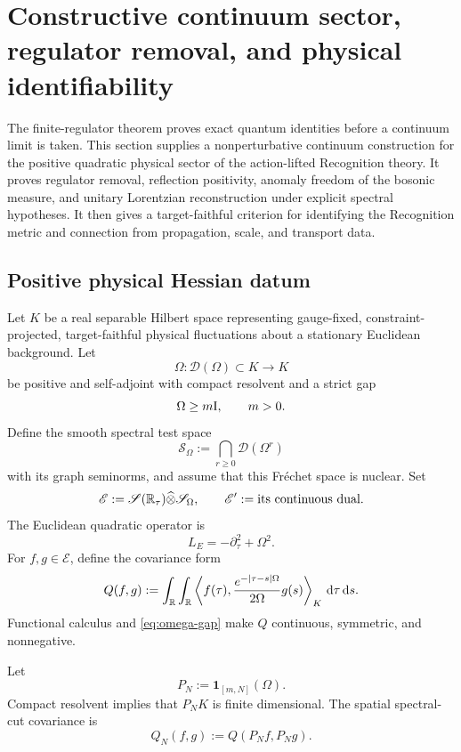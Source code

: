 \section{Constructive continuum sector, regulator removal, and physical identifiability}
\label{sec:constructive-continuum}

The finite-regulator theorem proves exact quantum identities before a continuum limit is taken.  This section supplies a nonperturbative continuum construction for the positive quadratic physical sector of the action-lifted Recognition theory.  It proves regulator removal, reflection positivity, anomaly freedom of the bosonic measure, and unitary Lorentzian reconstruction under explicit spectral hypotheses.  It then gives a target-faithful criterion for identifying the Recognition metric and connection from propagation, scale, and transport data.

\subsection{Positive physical Hessian datum}

Let $K$ be a real separable Hilbert space representing gauge-fixed, constraint-projected, target-faithful physical fluctuations about a stationary Euclidean background.  Let
\[
\Omega:\mathcal D(\Omega)\subset K\longrightarrow K
\]
be positive and self-adjoint with compact resolvent and a strict gap
\begin{equation}
\Omega\ge m\mathrm I,
\qquad m>0.
\label{eq:omega-gap}
\end{equation}
Define the smooth spectral test space
\[
\mathscr S_\Omega:=\bigcap_{r\ge0}\mathcal D(\Omega^r)
\]
with its graph seminorms, and assume that this Fr\'{e}chet space is nuclear.  Set
\[
\mathscr E
:=\mathscr S(\mathbb R_\tau)\widehat\otimes\mathscr S_\Omega,
\qquad
\mathscr E'
:=\text{its continuous dual}.
\]
The Euclidean quadratic operator is
\[
L_E=-\partial_\tau^2+\Omega^2.
\]
For $f,g\in\mathscr E$, define the covariance form
\begin{equation}
Q(f,g)
:=\int_{\mathbb R}\int_{\mathbb R}
\left\langle
f(\tau),
\frac{e^{-\left|\tau-s\right|\Omega}}{2\Omega}
 g(s)
\right\rangle_K
\,\mathrm d\tau\,\mathrm d s.
\label{eq:continuum-covariance}
\end{equation}
Functional calculus and \eqref{eq:omega-gap} make $Q$ continuous, symmetric, and nonnegative.

Let
\[
P_N:=\mathbf 1_{[m,N]}(\Omega).
\]
Compact resolvent implies that $P_NK$ is finite dimensional.  The spatial spectral-cut covariance is
\begin{equation}
Q_N(f,g):=Q(P_Nf,P_Ng).
\label{eq:cutoff-covariance}
\end{equation}

